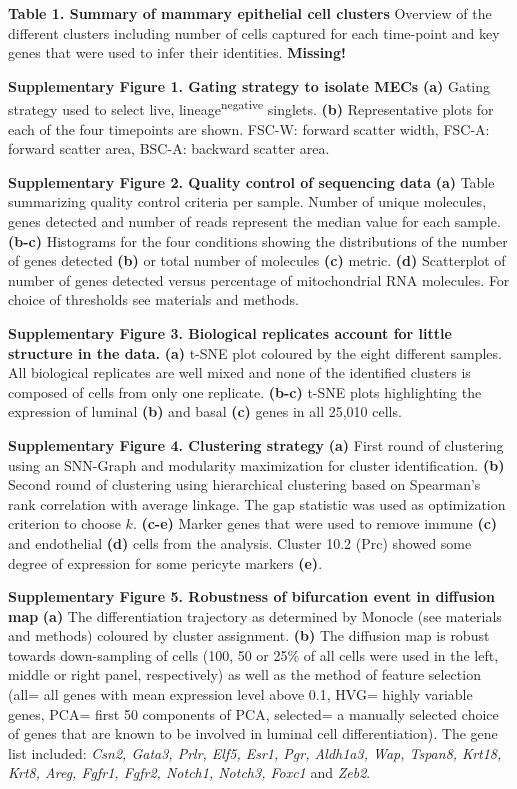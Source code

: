 \documentclass[titlepage, 12pt, oneside]{amsart}
\newcommand{\faketable}[1]%
{\refstepcounter{table}\label{#1}}
\begin{document}
\textbf{Table 1. Summary of mammary epithelial cell clusters}
\faketable{T1}
Overview of the different clusters including number of cells captured for each time-point and key genes that were used to infer their identities.
\textbf{Missing!}

\textbf{Supplementary Figure 1. Gating strategy to isolate MECs}
\textbf{(a)} Gating strategy used to select live, lineage\textsuperscript{negative} singlets.
\textbf{(b)} Representative plots for each of the four timepoints are shown. FSC-W: forward scatter width, FSC-A: forward scatter area, BSC-A: backward scatter area.

\textbf{Supplementary Figure 2. Quality control of sequencing data}
\textbf{(a)} Table summarizing quality control criteria per sample.
Number of unique molecules, genes detected and number of reads represent the median value for each sample.
\textbf{(b-c)} Histograms for the four conditions showing the distributions of the number of genes detected \textbf{(b)} or total number of molecules \textbf{(c)} metric.
\textbf{(d)} Scatterplot of number of genes detected versus percentage of mitochondrial RNA molecules.
For choice of thresholds see materials and methods.

\textbf{Supplementary Figure 3. Biological replicates account for little structure in the data.}
\textbf{(a)} t-SNE plot coloured by the eight different samples. All biological replicates are well mixed and none of the identified clusters is composed of cells from only one replicate.
\textbf{(b-c)} t-SNE plots highlighting the expression of luminal \textbf{(b)} and basal \textbf{(c)} genes in all 25,010 cells.

\textbf{Supplementary Figure 4. Clustering strategy}
\textbf{(a)} First round of clustering using an SNN-Graph and modularity maximization for cluster identification.
\textbf{(b)} Second round of clustering using hierarchical clustering based on Spearman's rank correlation with average linkage.
The gap statistic was used as optimization criterion to choose $k$.
\textbf{(c-e)} Marker genes that were used to remove immune \textbf{(c)} and endothelial \textbf{(d)} cells from the analysis. Cluster 10.2 (Prc) showed some degree of expression for some pericyte markers \textbf{(e)}.

\textbf{Supplementary Figure 5. Robustness of bifurcation event in diffusion map}
\textbf{(a)} The differentiation trajectory as determined by Monocle (see materials and methods) coloured by cluster assignment.
\textbf{(b)} The diffusion map is robust towards down-sampling of cells (100, 50 or 25\% of all cells were used in the left, middle or right panel, respectively) as well as the method of feature selection (all= all genes with mean expression level above 0.1, HVG= highly variable genes, PCA= first 50 components of PCA, selected= a manually selected choice of genes that are known to be involved in luminal cell differentiation).
The gene list included: \textit{Csn2, Gata3, Prlr, Elf5, Esr1, Pgr, Aldh1a3, Wap, Tspan8, Krt18, Krt8, Areg, Fgfr1, Fgfr2, Notch1, Notch3, Foxc1} and \textit{Zeb2}.
\end{document}
